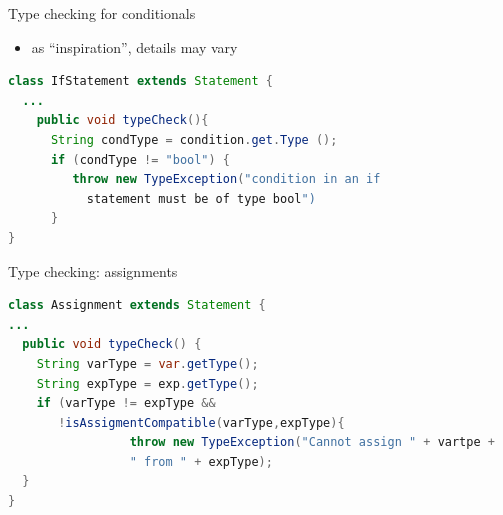 \documentclass{beamer}
\begin{document}
\begin{frame}[label={sec:orgd1ef86f},fragile,plain]{Type checking for conditionals}
 \begin{itemize}
\item as ``inspiration'', details may vary
\end{itemize}


\begin{lstlisting}[language=java,numbers=none]
  class IfStatement extends Statement {
  ...
    public void typeCheck(){
      String condType = condition.get.Type ();
      if (condType != "bool") {  
         throw new TypeException("condition in an if 
           statement must be of type bool")
      }
}
\end{lstlisting}
\end{frame}
\begin{frame}[label={sec:org887af4d},fragile,plain]{Type checking: assignments}
 \begin{lstlisting}[language=java,numbers=none]
class Assignment extends Statement {
...
  public void typeCheck() {
    String varType = var.getType();
    String expType = exp.getType();
    if (varType != expType &&
       !isAssigmentCompatible(varType,expType){
                 throw new TypeException("Cannot assign " + vartpe + 
                 " from " + expType);
  }
}

\end{lstlisting}
\end{frame}
\end{document}
